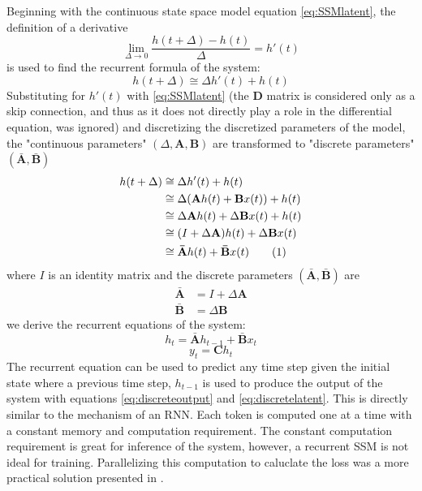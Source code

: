 \documentclass[conference]{IEEEtran}
\newcommand{\mbfb}[1]{\mathbf{\bar{{#1}}}}
\begin{document}
Beginning with the continuous state space model equation \eqref{eq:SSMlatent}, the definition of a derivative
\begin{equation*}
    \lim_{\Delta\to0} \frac{h(t+\Delta)-h(t)}{\Delta} = h'(t)
\end{equation*}
is used to find the recurrent formula of the system:
\begin{equation}
    h(t+\Delta) \cong \Delta h'(t) + h(t)
\end{equation}
Substituting for $h'(t)$ with \eqref{eq:SSMlatent} (the $\mathbf{D}$ matrix is considered only as a skip connection, and thus as it does not directly play a role in the differential equation, was ignored) and discretizing the discretized parameters of the model, the "continuous parameters" $(\Delta, \mathbf{A}, \mathbf{B})$ are transformed to "discrete parameters" $(\mbfb{A}, \mbfb{B})$
\newcommand\numberthis{\addtocounter{equation}{1}\tag{\theequation}}
\begin{align*}
    h(t+\Delta) & \cong \Delta h'(t) + h(t)                                              \\
                & \cong \Delta(\mathbf{A}h(t) + \mathbf{B}x(t)) + h(t)                   \\
                & \cong \Delta \mathbf{A}h(t) + \Delta \mathbf{B}x(t) + h(t)             \\
                & \cong (I + \Delta \mathbf{A})h(t) + \Delta \mathbf{B}x(t)              \\
                & \cong \mbfb{A}h(t) + \mbfb{B}x(t) \numberthis \label{eq:recurrentform}
\end{align*}
where $I$ is an identity matrix and the discrete parameters $(\mbfb{A}, \mbfb{B})$ are
\begin{align*}
    \mbfb{A} & = I + \Delta \mathbf{A} \\
    \mbfb{B} & = \Delta \mathbf{B}
\end{align*}
we derive the recurrent equations of the system:
\begin{equation}\label{eq:discretelatent}
    h_t = \mbfb{A}h_{t-1} + \mbfb{B}x_t
\end{equation}
\begin{equation}\label{eq:discreteoutput}
    y_t = \mathbf{C}h_t
\end{equation}
The recurrent equation can be used to predict any time step given the initial state where a previous time step, $h_{t-1}$ is used to produce the output of the system with equations \eqref{eq:discreteoutput} and \eqref{eq:discretelatent}. This is directly similar to the mechanism of an RNN. Each token is computed one at a time with a constant memory and computation requirement. The constant computation requirement is great for inference of the system, however, a recurrent SSM is not ideal for training. Parallelizing this computation to caluclate the loss was a more practical solution presented in \cite{gu2022efficiently}.
\end{document}
